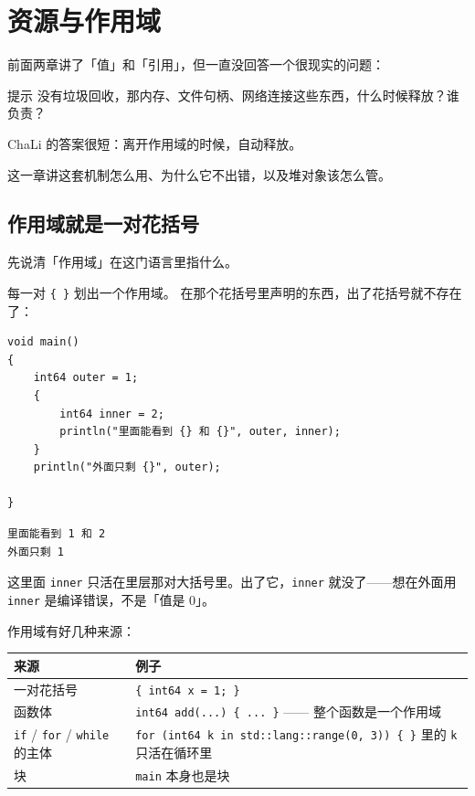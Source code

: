 \chapter{资源与作用域}
\label{ch:08}

前面两章讲了「值」和「引用」，但一直没回答一个很现实的问题：

\begin{tip}{提示}
没有垃圾回收，那内存、文件句柄、网络连接这些东西，什么时候释放？谁负责？
\end{tip}

ChaLi 的答案很短：离开作用域的时候，自动释放。

这一章讲这套机制怎么用、为什么它不出错，以及堆对象该怎么管。

\section{作用域就是一对花括号}

先说清「作用域」在这门语言里指什么。

每一对 \texttt{\{ \}} 划出一个作用域。 在那个花括号里声明的东西，出了花括号就不存在了：

\par
\medskip
\begin{lstlisting}[style=chali]
void main()
{
    int64 outer = 1;
    {
        int64 inner = 2;
        println("里面能看到 {} 和 {}", outer, inner);
    }
    println("外面只剩 {}", outer);

}
\end{lstlisting}
\par
\medskip

\par
\medskip
\begin{lstlisting}[style=out]
里面能看到 1 和 2
外面只剩 1
\end{lstlisting}
\par
\medskip

这里面 \texttt{inner} 只活在里层那对大括号里。出了它，\texttt{inner} 就没了——想在外面用 \texttt{inner} 是编译错误，不是「值是 0」。

作用域有好几种来源：

{\small\setlength{\tabcolsep}{4pt}
\begin{longtable}{>{\raggedright\arraybackslash}p{}>{\raggedright\arraybackslash}p{}}
\toprule
来源 & 例子 \\
\midrule
\endhead
一对花括号 & \texttt{\{ int64 x =\allowbreak{} 1; \}} \\
函数体 & \texttt{int64 add(\allowbreak{}.\allowbreak{}.\allowbreak{}.\allowbreak{})\allowbreak{} \{ .\allowbreak{}.\allowbreak{}.\allowbreak{} \}} —— 整个函数是一个作用域 \\
\texttt{if} / \texttt{for} / \texttt{while} 的主体 & \texttt{for (\allowbreak{}int64 k in std:\allowbreak{}:\allowbreak{}lang:\allowbreak{}:\allowbreak{}range(\allowbreak{}0,\allowbreak{} 3)\allowbreak{})\allowbreak{} \{ \}} 里的 \texttt{k} 只活在循环里 \\
块 & \texttt{main} 本身也是块 \\
\bottomrule
\end{longtable}
}

